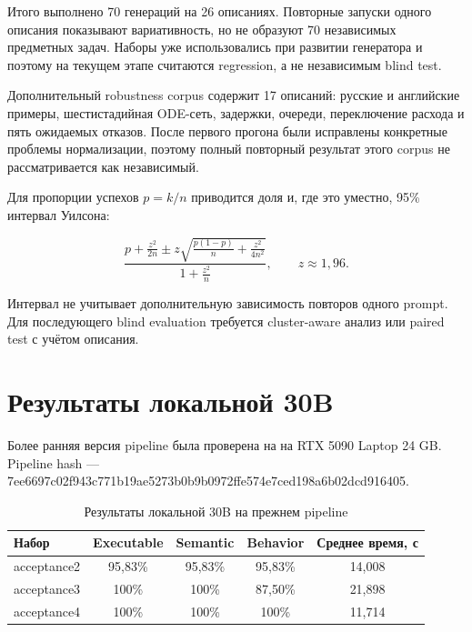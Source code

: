 Итого выполнено 70 генераций на 26 описаниях. Повторные запуски одного описания показывают вариативность, но не образуют 70 независимых предметных задач. Наборы уже использовались при развитии генератора и поэтому на текущем этапе считаются regression, а не независимым blind test.

Дополнительный robustness corpus содержит 17 описаний: русские и английские примеры, шестистадийная ODE-сеть, задержки, очереди, переключение расхода и пять ожидаемых отказов. После первого прогона были исправлены конкретные проблемы нормализации, поэтому полный повторный результат этого corpus не рассматривается как независимый.

Для пропорции успехов $p=k/n$ приводится доля и, где это уместно, 95\% интервал Уилсона:

\begin{equation}
    \frac{p+\frac{z^2}{2n}\pm z\sqrt{\frac{p(1-p)}{n}+\frac{z^2}{4n^2}}}{1+\frac{z^2}{n}},\qquad z\approx1{,}96.
    \label{eq:wilson}
\end{equation}

Интервал не учитывает дополнительную зависимость повторов одного prompt. Для последующего blind evaluation требуется cluster-aware анализ или paired test с учётом описания.

\section{Результаты локальной 30B}

Более ранняя версия pipeline была проверена на  на RTX 5090 Laptop 24 GB. Pipeline hash --- {\scriptsize\ttfamily 7ee6697c02f943c7\allowbreak 71b19ae5273b0b9b\allowbreak 0972ffe574e7ced1\allowbreak 98a6b02dcd916405}.

\begin{table}[H]
    \centering
    \caption{Результаты локальной 30B на прежнем pipeline}
    \label{tab:results-30b}
    \small
    \begin{tabular}{lcccc}
        \toprule
        Набор & Executable & Semantic & Behavior & Среднее время, с \\
        \midrule
        acceptance2 & 95,83\% & 95,83\% & 95,83\% & 14,008 \\
        acceptance3 & 100\% & 100\% & 87,50\% & 21,898 \\
        acceptance4 & 100\% & 100\% & 100\% & 11,714 \\
        \bottomrule
    \end{tabular}
\end{table}

